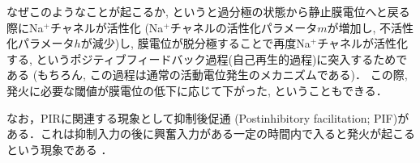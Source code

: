 \documentclass[titlepage]{ltjsbook}
\begin{document}
なぜこのようなことが起こるか, というと過分極の状態から静止膜電位へと戻る際にNa$^+$チャネルが活性化 (Na$^+$チャネルの活性化パラメータ$m$が増加し, 不活性化パラメータ$h$が減少)し, 膜電位が脱分極することで再度Na$^+$チャネルが活性化する, というポジティブフィードバック過程(自己再生的過程)に突入するためである (もちろん, この過程は通常の活動電位発生のメカニズムである)． この際, 発火に必要な閾値が膜電位の低下に応じて下がった, ということもできる．

なお，PIRに関連する現象として抑制後促通 (Postinhibitory facilitation; PIF)がある．これは抑制入力の後に興奮入力がある一定の時間内で入ると発火が起こるという現象である \citep{Dodla2006-fj}．
\printbibliography[segment=\therefsegment,heading=subbibliography,title={参考文献}]
\end{document}
